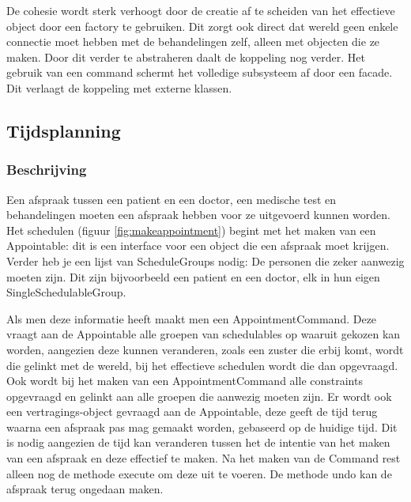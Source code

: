 \documentclass[a4paper]{article}
\begin{document}
De cohesie wordt sterk verhoogt door de creatie af te scheiden van het effectieve object door een factory te gebruiken. Dit zorgt ook direct dat wereld geen enkele connectie moet hebben met de behandelingen zelf, alleen met objecten die ze maken. Door dit verder te abstraheren daalt de koppeling nog verder. Het gebruik van een command schermt het volledige subsysteem af door een facade. Dit verlaagt de koppeling met externe klassen.

\subsection{Tijdsplanning \label{sec:scheduling}}
\subsubsection{Beschrijving}
Een afspraak tussen een patient en een doctor, een medische test en behandelingen moeten een afspraak hebben voor ze uitgevoerd kunnen worden. Het schedulen (figuur \ref{fig:makeappointment}) begint met het maken van een Appointable: dit is een interface voor een object die een afspraak moet krijgen. Verder heb je een lijst van ScheduleGroups nodig: De personen die zeker aanwezig moeten zijn. Dit zijn bijvoorbeeld een patient en een doctor, elk in hun eigen SingleSchedulableGroup. 

Als men deze informatie heeft maakt men een AppointmentCommand. Deze vraagt aan de Appointable alle groepen van schedulables op waaruit gekozen kan worden, aangezien deze kunnen veranderen, zoals een zuster die erbij komt, wordt die gelinkt met de wereld, bij het effectieve schedulen wordt die dan opgevraagd. Ook wordt bij het maken van een AppointmentCommand alle constraints opgevraagd en gelinkt aan alle groepen die aanwezig moeten zijn. Er wordt ook een vertragings-object gevraagd aan de Appointable, deze geeft de tijd terug waarna een afspraak pas mag gemaakt worden, gebaseerd op de huidige tijd. Dit is nodig aangezien de tijd kan veranderen tussen het de intentie van het maken van een afspraak en deze effectief te maken. Na het maken van de Command rest alleen nog de methode execute om deze uit te voeren. De methode undo kan de afspraak terug ongedaan maken.
\end{document}
